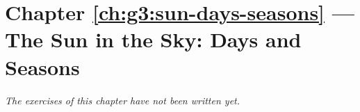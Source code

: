 \section*{Chapter \ref{ch:g3:sun-days-seasons} --- The Sun in the Sky: Days and Seasons}


\emph{The exercises of this chapter have not been written yet.}
